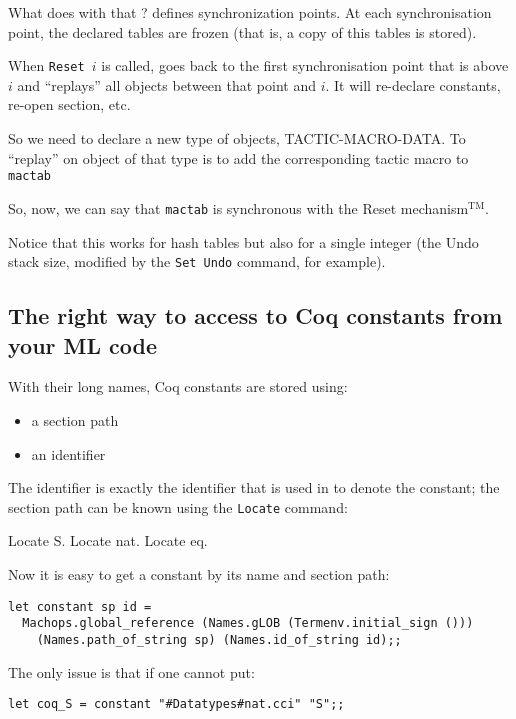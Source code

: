 What does \Coq{} with that ? \Coq{} defines synchronization points.
At each synchronisation point, the declared tables are frozen (that
is, a copy of this tables is stored).

When \texttt{Reset }$i$ is called, \Coq{} goes back to the first
synchronisation point that is above $i$ and ``replays'' all objects
between that point 
and $i$. It will re-declare constants, re-open section, etc.

So we need to declare a new type of objects, TACTIC-MACRO-DATA. To
``replay'' on object of that type is to add the corresponding tactic
macro to \texttt{mactab}

So, now, we can say that \texttt{mactab} is synchronous with the Reset
mechanism$^{\mathrm{TM}}$.

Notice that this works for hash tables but also for a single integer
(the Undo stack size, modified by the \texttt{Set Undo} command, for
example).

\subsection{The right way to access to Coq constants from your ML code}

With their long names, Coq constants are stored using:

\begin{itemize}
\item a section path
\item an identifier
\end{itemize}

The identifier is exactly the identifier that is used in \Coq{} to
denote the constant; the section path can be known using the
\texttt{Locate} command:

\begin{coq_example}
  Locate S.
  Locate nat.
  Locate eq.
\end{coq_example}

Now it is easy to get a constant by its name and section path:


\begin{verbatim}
let constant sp id = 
  Machops.global_reference (Names.gLOB (Termenv.initial_sign ())) 
    (Names.path_of_string sp) (Names.id_of_string id);;
\end{verbatim}


The only issue is that if one cannot put:


\begin{verbatim}
let coq_S = constant "#Datatypes#nat.cci" "S";;
\end{verbatim}


